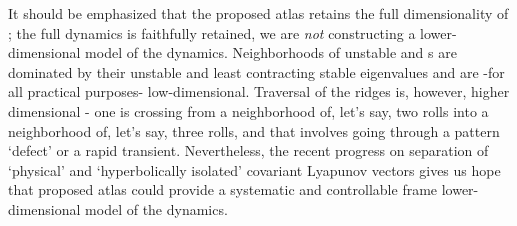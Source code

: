 It should be emphasized that the proposed atlas retains the full
dimensionality of \reducedsp; the full dynamics is faithfully retained,
we are \emph{not} constructing a lower-dimensional model of the dynamics.
Neighborhoods of unstable \eqva and \po s are dominated by their unstable
and least contracting stable eigenvalues and are -for all practical
purposes- low-dimensional. Traversal of the ridges is, however, higher
dimensional - one is crossing from a neighborhood of, let's say, two
rolls into a neighborhood of, let's say, three rolls, and that involves
going through a pattern `defect' or a rapid transient. Nevertheless, the
recent progress on separation of `physical' and `hyperbolically isolated'
covariant Lyapunov
vectors gives us
hope that proposed atlas could provide a systematic and controllable
frame lower-dimensional model of the dynamics.

%
